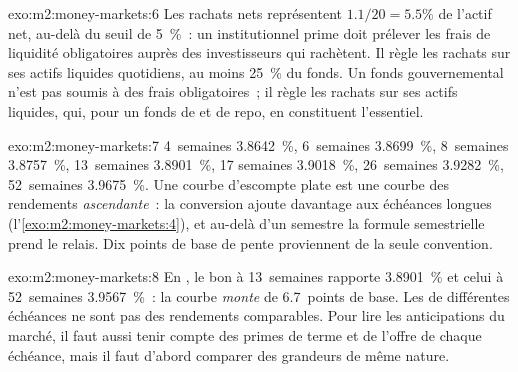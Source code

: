 \begin{solution}{exo:m2:money-markets:6}
Les rachats nets représentent $1.1/20 = 5.5\%$ de l'actif net, au-delà du seuil de 5~\%~: un
 institutionnel prime doit prélever les frais de liquidité obligatoires auprès des
investisseurs qui rachètent. Il règle les rachats sur ses actifs liquides quotidiens, au
moins 25~\% du fonds. Un fonds gouvernemental n'est pas soumis à des frais obligatoires~; il règle
les rachats sur ses actifs liquides, qui, pour un fonds de  et de repo, en constituent l'essentiel.
\end{solution}

\begin{solution}{exo:m2:money-markets:7}
4~semaines 3.8642~\%, 6~semaines 3.8699~\%, 8~semaines 3.8757~\%, 13~semaines 3.8901~\%, 17
semaines 3.9018~\%, 26~semaines 3.9282~\%, 52~semaines 3.9675~\%. Une courbe d'escompte plate
est une courbe des rendements \emph{ascendante}~: la conversion ajoute davantage aux
échéances longues (l'\cref{exo:m2:money-markets:4}), et au-delà d'un semestre la
formule semestrielle prend le relais. Dix points de base de pente proviennent de la
seule convention.
\end{solution}

\begin{solution}{exo:m2:money-markets:8}
En , le bon à 13~semaines rapporte 3.8901~\% et celui à 52~semaines
3.9567~\%~: la courbe \emph{monte} de 6.7~points de base. Les  de
différentes échéances ne sont pas des rendements comparables. Pour lire les anticipations du
marché, il faut aussi tenir compte des primes de terme et de l'offre de chaque
échéance, mais il faut d'abord comparer des grandeurs de même nature.
\end{solution}


